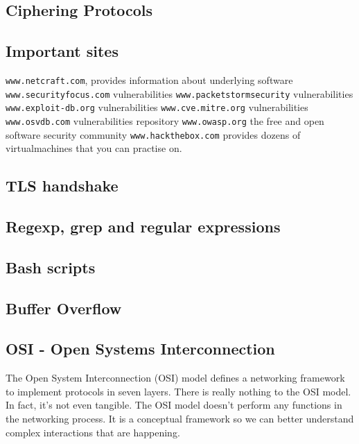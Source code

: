\documentclass{article}[12pt]
\begin{document}
\subsection{Ciphering Protocols}

\subsection{Important sites}
\texttt{www.netcraft.com}, provides information about underlying software
\texttt{www.securityfocus.com} vulnerabilities
\texttt{www.packetstormsecurity} vulnerabilities
\texttt{www.exploit-db.org} vulnerabilities
\texttt{www.cve.mitre.org} vulnerabilities
\texttt{www.osvdb.com} vulnerabilities repository
\texttt{www.owasp.org} the free and open software security community
\texttt{www.hackthebox.com} provides dozens of virtualmachines that you can practise on.
\texttt{}
\texttt{}
\texttt{}


\subsection{TLS handshake}

\subsection{Regexp, grep and regular expressions}
\subsection{Bash scripts}
\subsection{Buffer Overflow}



\subsection{OSI - Open Systems Interconnection \cite{osi} }
\label{subsec:osi}
The Open System Interconnection (OSI) model defines a networking framework to implement protocols in seven layers.
There is really nothing to the OSI model.
In fact, it's not even tangible.
The OSI model doesn't perform any functions in the networking process.
It is a conceptual framework so we can better understand complex interactions that are happening.
\end{document}
